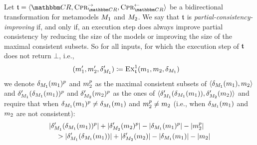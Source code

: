 \begin{definition}
    \label{def:partialconsistencyimprovingtransformation}
    Let $\transformation{t} = \tupled{\consistencyrelationset{CR}, \consistencypreservationrule{\consistencyrelationset{CR}}^{\rightarrow}, \consistencypreservationrule{\consistencyrelationset{CR}}^{\leftarrow}}$ be a bidirectional transformation for metamodels $M_{1}$ and $M_{2}$.
    We say that $\mathfrak{t}$ is \emph{partial-consistency-improving} if, and only if, an execution step does always improve partial consistency by reducing the size of the models or improving the size of the maximal consistent subsets.
    So for all inputs, for which the execution step of $\mathfrak{t}$ does not return $\bot$, i.e.,
    \begin{align*}
        & (m_{1}', m_{2}', \delta_{M_{1}}') \coloneqq \textsc{Ex}_{\mathfrak{t}}^1(m_{1}, m_{2}, \delta_{M_{1}})
    \end{align*}
    we denote $\delta_{M_{1}}(m_{1})^p$ and $m_{2}^p$ as the maximal consistent subsets of $\langle \delta_{M_{1}}(m_{1}), m_{2} \rangle$ and $\delta_{M_{1}}'(\delta_{M_{1}}(m_{1}))^p$ and $\delta_{M_{2}}'(m_{2})^p$ as the ones of $\langle \delta_{M_{1}}'(\delta_{M_{1}}(m_{1})), \delta_{M_{2}}'(m_{2}) \rangle$
    and require that when $\delta_{M_{1}}(m_{1})^p \neq \delta_{M_{1}}(m_{1})$ and $m_{2}^p \neq m_{2}$ (i.e., when $\delta_{M_{1}}(m_{1})$ and $m_{2}$ are not consistent):
    \begin{align*}
        &
        \lvert\delta_{M_{1}}'(\delta_{M_{1}}(m_{1}))^p\rvert + \lvert\delta_{M_{2}}'(m_{2})^p\rvert 
        - \lvert\delta_{M_{1}}(m_{1})^p\rvert - \lvert m_{2}^p\rvert \\
        & \hspace{1em}
        > \lvert\delta_{M_{1}}'(\delta_{M_{1}}(m_{1}))\rvert + \lvert\delta_{M_{2}}'(m_{2})\rvert 
        - \lvert\delta_{M_{1}}(m_{1})\rvert - \lvert m_{2}\rvert
    \end{align*}
\end{definition}


